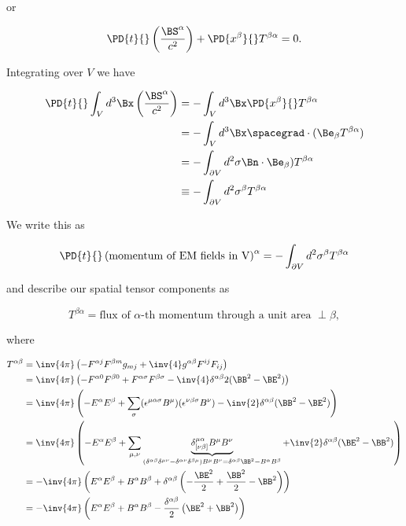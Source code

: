 or

\begin{equation}\label{eqn:relativisticElectrodynamicsL23:170}
\PD{t}{} \left( \frac{\BS^{\alpha}}{c^2} \right) + \PD{x^\beta}{} T^{\beta \alpha} = 0.
\end{equation}

Integrating over $V$ we have

\begin{align*}
\PD{t}{} \int_V d^3\Bx \left( \frac{\BS^{\alpha}}{c^2} \right) 
&= -\int_V d^3\Bx \PD{x^\beta}{} T^{\beta \alpha} \\
&= -\int_V d^3\Bx \spacegrad \cdot (\Be_\beta T^{\beta \alpha}) \\
&= -\int_{\partial V} d^2 \sigma \Bn \cdot \Be_\beta) T^{\beta \alpha} \\
&\equiv -\int_{\partial V} d^2 \sigma^\beta T^{\beta \alpha} \\
\end{align*}

We write this as

\begin{equation}\label{eqn:relativisticElectrodynamicsL23:190}
\PD{t}{} \left( \text{momentum of EM fields in V} \right)^\alpha = - \int_{\partial V} d^2 \sigma^\beta T^{\beta \alpha}
\end{equation}

and describe our spatial tensor components as

\begin{equation}\label{eqn:relativisticElectrodynamicsL23:210}
T^{\beta\alpha} = \text{flux of $\alpha$-th momentum through a unit area $\perp \beta$},
\end{equation}

where

\begin{align*}
T^{\alpha\beta} 
&= \inv{4\pi} \left( -F^{\alpha j} F^{\beta m} g_{m j} + \inv{4} g^{\alpha\beta} F^{ij}F_{ij} \right) \\
&= \inv{4\pi} \left( 
-F^{\alpha 0} F^{\beta 0} 
+F^{\alpha \sigma} F^{\beta \sigma} 
- \inv{4} \delta^{\alpha\beta} 2 (\BB^2 - \BE^2) \right) \\
&= \inv{4\pi} \left( 
-E^\alpha E^\beta
+\sum_\sigma 
(\epsilon^{\mu\alpha\sigma} B^\mu)
(\epsilon^{\nu\beta\sigma} B^\nu)
- \inv{2} \delta^{\alpha\beta} (\BB^2 - \BE^2) \right) \\
&= \inv{4\pi} \left( 
-E^\alpha E^\beta
+\sum_{\mu,\nu} \underbrace{\delta^{\mu\alpha}_{[\nu\beta]}
B^\mu B^\nu
}_{
(\delta^{\alpha \beta} \delta^{\mu \nu} - \delta^{\alpha \nu} \delta^{\beta \mu} ) 
B^\mu B^\nu
=
\delta^{\alpha\beta}\BB^2 - B^\alpha B^\beta
} 
+ \inv{2} \delta^{\alpha\beta} (\BE^2 - \BB^2) \right) \\
&=
- \inv{4\pi} \left(
E^\alpha E^\beta
+B^\alpha B^\beta
+ \delta^{\alpha\beta} 
\left(
-\frac{\BE^2}{2} + \frac{\BB^2}{2} - \BB^2 \right)
\right) \\
&=
- \inv{4\pi} \left(
E^\alpha E^\beta
+B^\alpha B^\beta
- \frac{\delta^{\alpha\beta} }{2}
\left(
\BE^2 + \BB^2 
\right)
\right) \\
\end{align*}

